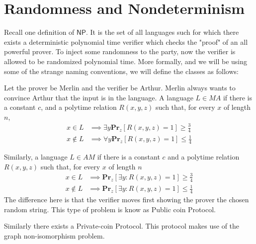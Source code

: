 \documentclass[twoside]{article}
\def\Pr{\mathbf{Pr}}
\def\NP{\mathsf{NP}}
\begin{document}
\section{Randomness and Nondeterminism}
Recall one definition of $\NP$. It is the set of all languages such for which there exists a deterministic polynomial time verifier which checks the "proof" of an all powerful prover. To inject some randomness to the party, now the verifier is allowed to be randomized polynomial time. More formally, and we will be using some of the strange naming conventions, we will define the classes as follows:
 
Let the prover be Merlin and the verifier be Arthur. Merlin always wants to convince Arthur that the input is in the language. A language $L \in MA$ if there is a constant $c$, and a polytime relation $R(x,y,z)$ such that, for every $x$ of length $n$, 
\begin{align*}
x \in L &\implies \exists y \Pr_z [R(x,y,z) = 1] \geq \frac{3}{4} \\
x \notin L &\implies \forall y \Pr_z[R(x,y,z) = 1] \leq \frac{1}{4}
\end{align*} 

Similarly, a language $L \in AM$ if there is a constant $c$ and a polytime relation $R(x,y,z)$ such that, for every $x$ of length $n$
\begin{align*}
x \in L &\implies \Pr_z [\exists y: R(x,y,z) = 1] \geq \frac{3}{4} \\
x \notin L &\implies \Pr_z[\exists y: R(x,y,z) = 1] \leq \frac{1}{4}
\end{align*}
The difference here is that the verifier moves first showing the prover the chosen random string. This type of problem is know as Public coin Protocol.

Similarly there exists a Private-coin Protocol. This protocol makes use of the graph non-isomorphism problem.  
 
\end{document}
